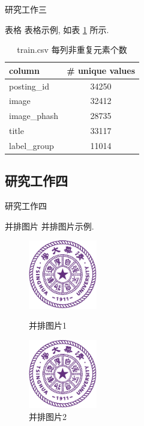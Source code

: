 \documentclass{beamer}
\begin{document}
\begin{frame}{研究工作三}
  \begin{block}{表格}
    表格示例, 如表 \ref{tab:unique_values} 所示. 

    \begin{table}[htbp]
      \small
      \centering
      \caption{train.csv 每列非重复元素个数}
      \label{tab:unique_values}
      \begin{tabular}{lc}
        \toprule
        column & \# unique values \\
        \midrule
        posting\_id & 34250 \\
        image & 32412 \\
        image\_phash & 28735 \\
        title & 33117 \\
        label\_group & 11014 \\
        \bottomrule
      \end{tabular}
    \end{table}
  \end{block}
\end{frame}

\subsection{研究工作四}

\begin{frame}{研究工作四}
  \begin{block}{并排图片}
    并排图片示例.
  \end{block}
  \begin{figure}[htbp]
    \centering
    \begin{minipage}[t]{0.48\textwidth}
      \centering
      \includegraphics[width=3cm]{thulogo.pdf}
      \caption{并排图片1}
      \label{fig:left_side}
    \end{minipage}
    \begin{minipage}[t]{0.48\textwidth}
      \centering
      \includegraphics[width=3cm]{thulogo.pdf}
      \caption{并排图片2}
      \label{fig:right_side}
    \end{minipage}
  \end{figure}
\end{frame}
\end{document}
